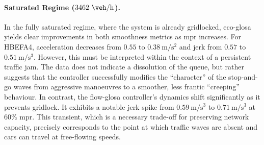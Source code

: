 \paragraph{Saturated Regime ($3462~\unit{\veh\per\hour}$).}
In the fully saturated regime, where the system is already gridlocked, \ac{eco-glosa} yields clear improvements in both smoothness metrics as \ac{mpr} increases. For HBEFA4, acceleration decreases from $0.55$ to $0.38~\unit{\metre\per\second\squared}$ and jerk from $0.57$ to $0.51~\unit{\metre\per\second\cubed}$. However, this must be interpreted within the context of a persistent traffic jam. The data does not indicate a dissolution of the queue, but rather suggests that the controller successfully modifies the \enquote{character} of the stop-and-go waves from aggressive manoeuvres to a smoother, less frantic \enquote{creeping} behaviour. In contrast, the \ac{flow-glosa} controller's dynamics shift significantly as it prevents gridlock. It exhibits a notable jerk spike from $0.59~\unit{\metre\per\second\cubed}$ to $0.71~\unit{\metre\per\second\cubed}$ at $60\%$ \ac{mpr}. This transient, which is a necessary trade-off for preserving network capacity, precisely corresponds to the point at which traffic waves are absent and cars can travel at free-flowing speeds.

